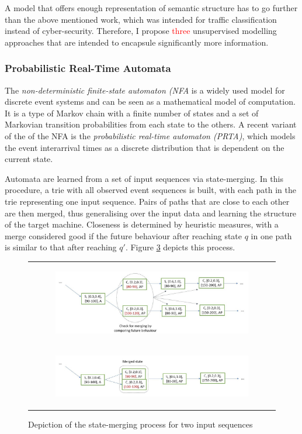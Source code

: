 \documentclass[a4paper,12pt,twoside]{report}
\begin{document}
A model that offers enough representation of semantic structure has to go further than the above mentioned work, which was intended for traffic classification instead of cyber-security. Therefore, I propose \textcolor{red}{three} unsupervised modelling approaches that are intended to encapsule significantly more information.

\subsubsection{Probabilistic Real-Time Automata}

The \textit{non-deterministic finite-state automaton (NFA} is a widely used model for discrete event systems and can be seen as a mathematical model of computation. It is a type of Markov chain with a finite number of states and a set of Markovian transition probabilities from each state to the others. A recent variant of the  of the NFA is the \textit{probabilistic real-time automaton (PRTA)}, which models the event interarrival times as a discrete distribution that is dependent on the current state. 

Automata are learned from a set of input sequences via state-merging. In this procedure, a trie with all observed event sequences is built, with each path in the trie representing one input sequence. Pairs of paths that are close to each other are then merged, thus generalising over the input data and learning the structure of the target machine. Closeness is determined by heuristic measures, with a merge  considered good if the future behaviour after  reaching state $q$ in one path is  similar to that after reaching $q\prime$. Figure \ref{Autt} depicts this process.


\begin{figure}[h]
\centering
\begin{tabular}{c}
\begin{subfigure}[b]{0.85\textwidth}\label{Autotrie}
\includegraphics[width=\textwidth]{images/Autotrie.jpg}
\caption{}
\end{subfigure}\\
\begin{subfigure}[b]{0.85\textwidth}\label{Automerge}
\includegraphics[width=\textwidth]{images/Automerge.jpg}
\caption{}
\end{subfigure}
\end{tabular}
\caption{Depiction of the state-merging process for two input sequences}\label{Autt}
\end{figure}
\end{document}
